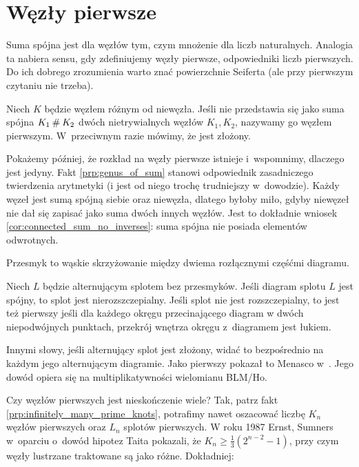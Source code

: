 
\section{Węzły pierwsze}
%
Suma spójna jest dla węzłów tym, czym mnożenie dla liczb naturalnych.
Analogia ta nabiera sensu, gdy zdefiniujemy węzły pierwsze, odpowiedniki liczb pierwszych.
Do ich dobrego zrozumienia warto znać powierzchnie Seiferta (ale przy pierwszym czytaniu nie trzeba).

\begin{definition}
\label{def:prime_knot}%
    Niech $K$ będzie węzłem różnym od niewęzła.
    Jeśli nie przedstawia się jako suma spójna $K_1 \mathbin{\#} K_2$ dwóch nietrywialnych węzłów $K_1, K_2$, nazywamy go węzłem pierwszym.
    W~przeciwnym razie mówimy, że jest złożony.
\end{definition}

Pokażemy później, że rozkład na węzły pierwsze istnieje i~wspomnimy, dlaczego jest jedyny.
Fakt \ref{prp:genus_of_sum} stanowi odpowiednik zasadniczego twierdzenia arytmetyki (i jest od niego trochę trudniejszy w~dowodzie).
Każdy węzeł jest sumą spójną siebie oraz niewęzła, dlatego byłoby miło, gdyby niewęzeł nie dał się zapisać jako suma dwóch innych węzłów.
Jest to dokładnie wniosek \ref{cor:connected_sum_no_inverses}: suma spójna nie posiada elementów odwrotnych.

Przesmyk to wąskie skrzyżowanie między dwiema rozłącznymi częśćmi diagramu.
%

\begin{proposition}
%
    Niech $L$ będzie alternującym splotem bez przesmyków.
    Jeśli diagram splotu $L$ jest spójny, to splot jest nierozszczepialny.
    Jeśli splot nie jest rozszczepialny, to jest też pierwszy jeśli dla każdego okręgu przecinającego diagram w dwóch niepodwójnych punktach, przekrój wnętrza okręgu z~diagramem jest łukiem.
\end{proposition}

Innymi słowy, jeśli alternujący splot jest złożony, widać to bezpośrednio na każdym jego alternującym diagramie.
Jako pierwszy pokazał to Menasco w~\cite{menasco84}.
%
Jego dowód opiera się na multiplikatywności wielomianu BLM/Ho.
%

Czy węzłów pierwszych jest nieskończenie wiele?
Tak, patrz fakt \ref{prp:infinitely_many_prime_knots}, potrafimy nawet oszacować liczbę $K_n$ węzłów pierwszych oraz $L_n$ splotów pierwszych.
W roku 1987 Ernst, Sumners \cite{ernst87} w~oparciu o~dowód hipotez Taita pokazali, że $K_n \ge \frac 1 3 (2^{n- 2} - 1)$, przy czym węzły lustrzane traktowane są jako różne.
%
%
Dokładniej:

